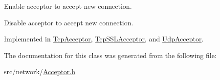 Enable acceptor to accept new connection. 

Disable acceptor to accept new connection. 

Implemented in \hyperlink{class_tcp_acceptor_aa3d7ee0f8878d8223f82e8fac5d30649}{Tcp\-Acceptor}, \hyperlink{class_tcp_s_s_l_acceptor_a74930bd991e9105de9d0b38945c1247b}{Tcp\-S\-S\-L\-Acceptor}, and \hyperlink{class_udp_acceptor_a2c7f954b671b83039ce74800180226c8}{Udp\-Acceptor}.



The documentation for this class was generated from the following file\-:\begin{DoxyCompactItemize}
\item 
src/network/\hyperlink{_acceptor_8h}{Acceptor.\-h}\end{DoxyCompactItemize}
